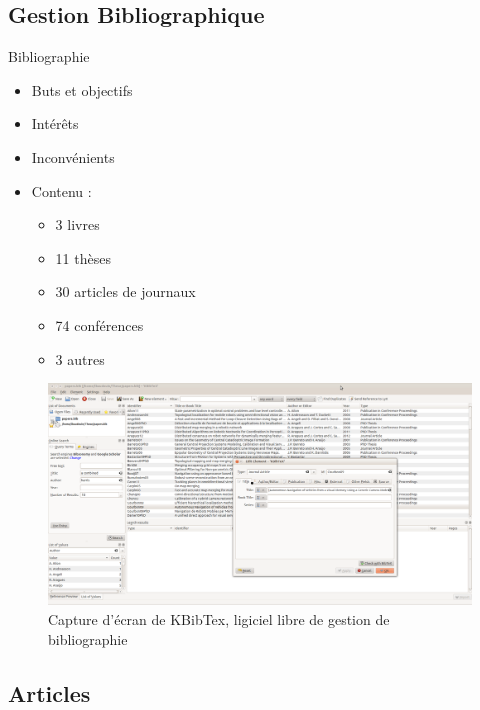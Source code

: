 \documentclass{beamer}
\begin{document}
\subsection*{Gestion Bibliographique}

\begin{frame}{Bibliographie}

  \begin{itemize}
  \item Buts et objectifs
  \item Intérêts %
  \item Inconvénients
    \vspace{5mm}
  \item Contenu : %
    \begin{itemize}
    \item 3 livres
    \item 11 thèses
    \item 30 articles de journaux
    \item 74 conférences
    \item 3 autres
    \end{itemize}
  \end{itemize}
\end{frame}

\begin{frame}
  \begin{figure}
    \includegraphics[width=1.0\linewidth]{images/KBibTex.png}
    \caption{Capture d'écran de KBibTex, ligiciel libre de gestion de bibliographie}
  \end{figure}
\end{frame}

\subsection*{Articles}
\end{document}
